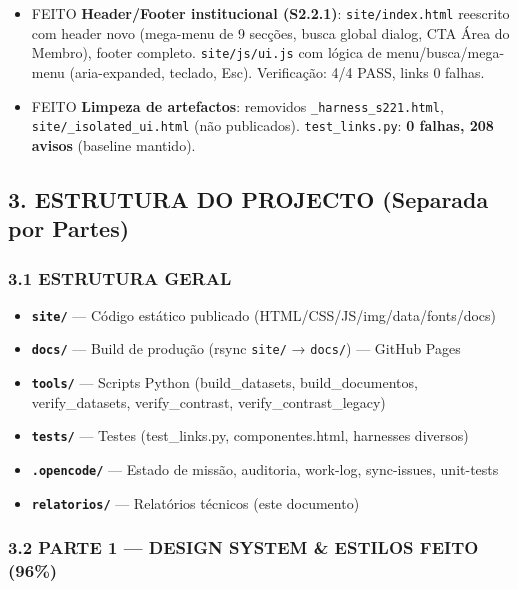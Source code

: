 \begin{itemize}
\tightlist
\item
  {FEITO} \textbf{Header/Footer institucional (S2.2.1)}:
  \texttt{site/index.html} reescrito com header novo (mega-menu de 9
  secções, busca global dialog, CTA Área do Membro), footer completo.
  \texttt{site/js/ui.js} com lógica de menu/busca/mega-menu
  (aria-expanded, teclado, Esc). Verificação: 4/4 PASS, links 0 falhas.
\item
  {FEITO} \textbf{Limpeza de artefactos}: removidos
  \texttt{\_harness\_s221.html}, \texttt{site/\_isolated\_ui.html} (não
  publicados). \texttt{test\_links.py}: \textbf{0 falhas, 208 avisos}
  (baseline mantido).
\end{itemize}

\subsection{3. ESTRUTURA DO PROJECTO (Separada por
Partes)}\label{estrutura-do-projecto-separada-por-partes}

\subsubsection{3.1 ESTRUTURA GERAL}\label{estrutura-geral}

\begin{itemize}
\tightlist
\item
  \textbf{\texttt{site/}} --- Código estático publicado
  (HTML/CSS/JS/img/data/fonts/docs)
\item
  \textbf{\texttt{docs/}} --- Build de produção (rsync \texttt{site/} →
  \texttt{docs/}) --- GitHub Pages
\item
  \textbf{\texttt{tools/}} --- Scripts Python (build\_datasets,
  build\_documentos, verify\_datasets, verify\_contrast,
  verify\_contrast\_legacy)
\item
  \textbf{\texttt{tests/}} --- Testes (test\_links.py, componentes.html,
  harnesses diversos)
\item
  \textbf{\texttt{.opencode/}} --- Estado de missão, auditoria,
  work-log, sync-issues, unit-tests
\item
  \textbf{\texttt{relatorios/}} --- Relatórios técnicos (este documento)
\end{itemize}

\subsubsection{\texorpdfstring{3.2 PARTE 1 --- DESIGN SYSTEM \& ESTILOS
{FEITO
(96\%)}}{3.2 PARTE 1 --- DESIGN SYSTEM \& ESTILOS FEITO (96\%)}}\label{parte-1-design-system-estilos-feito-96}

